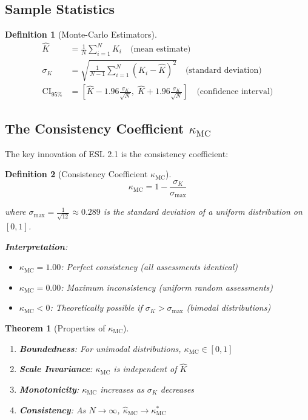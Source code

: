 \documentclass[11pt,a4paper]{article}
\newtheorem{definition}{Definition}[section]
\newtheorem{theorem}{Theorem}[section]
\theoremstyle{remark}
\begin{document}
\subsection{Sample Statistics}

\begin{definition}[Monte-Carlo Estimators]
\label{def:mc-estimators}
\begin{align}
\hat{K} &= \frac{1}{N} \sum_{i=1}^{N} K_i \quad \text{(mean estimate)} \\[0.5em]
\sigma_K &= \sqrt{\frac{1}{N-1} \sum_{i=1}^{N} (K_i - \hat{K})^2} \quad \text{(standard deviation)} \\[0.5em]
\text{CI}_{95\%} &= \left[ \hat{K} - 1.96 \frac{\sigma_K}{\sqrt{N}}, \; \hat{K} + 1.96 \frac{\sigma_K}{\sqrt{N}} \right] \quad \text{(confidence interval)}
\end{align}
\end{definition}

\subsection{The Consistency Coefficient $\kappa_{\text{MC}}$}

The key innovation of ESL 2.1 is the consistency coefficient:

\begin{definition}[Consistency Coefficient $\kappa_{\text{MC}}$]
\label{def:kappa-mc}
\begin{equation}
\kappa_{\text{MC}} = 1 - \frac{\sigma_K}{\sigma_{\max}}
\end{equation}

where $\sigma_{\max} = \frac{1}{\sqrt{12}} \approx 0.289$ is the standard deviation of a uniform distribution on $[0, 1]$.

\textbf{Interpretation}:
\begin{itemize}
    \item $\kappa_{\text{MC}} = 1.00$: Perfect consistency (all assessments identical)
    \item $\kappa_{\text{MC}} = 0.00$: Maximum inconsistency (uniform random assessments)
    \item $\kappa_{\text{MC}} < 0$: Theoretically possible if $\sigma_K > \sigma_{\max}$ (bimodal distributions)
\end{itemize}
\end{definition}

\begin{theorem}[Properties of $\kappa_{\text{MC}}$]
\label{thm:kappa-properties}
\begin{enumerate}
    \item \textbf{Boundedness}: For unimodal distributions, $\kappa_{\text{MC}} \in [0, 1]$
    \item \textbf{Scale Invariance}: $\kappa_{\text{MC}}$ is independent of $\hat{K}$
    \item \textbf{Monotonicity}: $\kappa_{\text{MC}}$ increases as $\sigma_K$ decreases
    \item \textbf{Consistency}: As $N \to \infty$, $\hat{\kappa}_{\text{MC}} \to \kappa_{\text{MC}}^*$
\end{enumerate}
\end{theorem}
\end{document}
